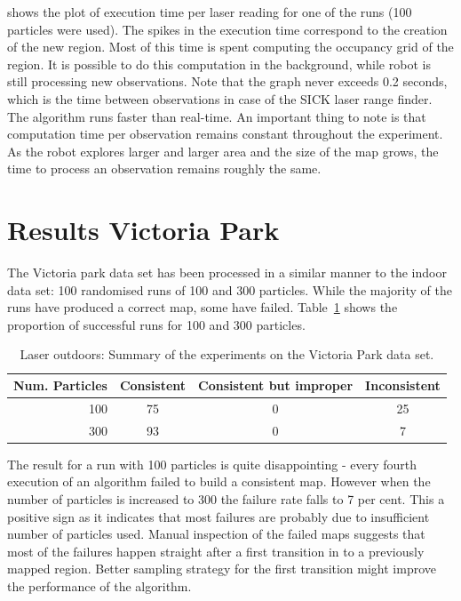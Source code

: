  shows the plot of execution
time per laser reading for one of the runs (100 particles were used).
The spikes in the execution time correspond to the creation of the new
region. Most of this time is spent computing the occupancy grid of the
region. It is possible to do this computation in the background, while
robot is still processing new observations. Note that the graph never
exceeds 0.2 seconds, which is the time between observations in case of
the SICK laser range finder. The algorithm runs faster than
real-time. An important thing to note is that computation time per
observation remains constant throughout the experiment. As the robot
explores larger and larger area and the size of the map grows, the
time to process an observation remains roughly the same.


\section {Results Victoria Park}

The Victoria park data set has been processed in a similar manner to
the indoor data set: 100 randomised runs of 100 and 300
particles. While the majority of the runs have produced a correct map,
some have failed. Table~\ref{tab:results_victoria_park} shows the
proportion of successful runs for 100 and 300 particles.


\begin{table}[ht]
\center
\begin{tabular}{r|c|c|c}
Num. Particles & Consistent & Consistent but improper & Inconsistent\\
\hline
100 & 75  & 0 & 25 \\
300 & 93  & 0 & 7\\
\end{tabular}
\caption{Laser outdoors: Summary of the experiments on the Victoria Park data set.}
\label{tab:results_victoria_park}
\end{table}

The result for a run with 100 particles is quite disappointing - every
fourth execution of an algorithm failed to build a consistent
map. However when the number of particles is increased to 300 the
failure rate falls to 7 per cent. This a positive sign as it indicates
that most failures are probably due to insufficient number of particles
used. Manual inspection of the failed maps suggests that most of the
failures happen straight after a first transition in to a previously
mapped region. Better sampling strategy for the first transition might
improve the performance of the algorithm.

